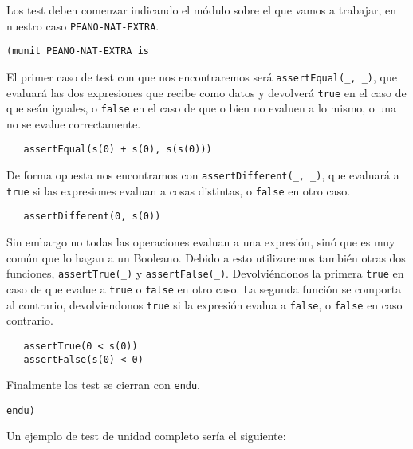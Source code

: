 Los test deben comenzar indicando el módulo sobre el que vamos a trabajar, en nuestro caso \texttt{PEANO-NAT-EXTRA}. \par

{\codesize
\begin{verbatim}
(munit PEANO-NAT-EXTRA is
\end{verbatim}
}

El primer caso de test con que nos encontraremos será \verb"assertEqual(_, _)", que evaluará las dos expresiones que recibe como datos y devolverá \texttt{true} en el caso de que seán iguales, o \texttt{false} en el caso de que o bien no evaluen a lo mismo, o una no se evalue correctamente. \par

{\codesize
\begin{verbatim}
   assertEqual(s(0) + s(0), s(s(0)))
\end{verbatim}
}

De forma opuesta nos encontramos con \verb"assertDifferent(_, _)", que evaluará a \texttt{true} si las expresiones evaluan a cosas distintas, o \texttt{false} en otro caso. \par

{\codesize
\begin{verbatim}
   assertDifferent(0, s(0))
\end{verbatim}
}

Sin embargo no todas las operaciones evaluan a una expresión, sinó que es muy común que lo hagan a un Booleano. Debido a esto utilizaremos también otras dos funciones, \verb"assertTrue(_)" y \verb"assertFalse(_)". Devolviéndonos la primera \texttt{true} en caso de que evalue a \texttt{true} o \texttt{false} en otro caso. La segunda función se comporta al contrario, devolviendonos \texttt{true} si la expresión evalua a \texttt{false}, o \texttt{false} en caso contrario.\par

{\codesize
\begin{verbatim}
   assertTrue(0 < s(0))
   assertFalse(s(0) < 0)
\end{verbatim}
}

Finalmente los test se cierran con \texttt{endu}. \par

{\codesize
\begin{verbatim}
endu)
\end{verbatim}
}

Un ejemplo de test de unidad completo sería el siguiente: \par

